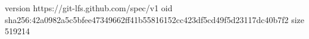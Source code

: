 version https://git-lfs.github.com/spec/v1
oid sha256:42a0982a5c5bfee47349662ff41b55816152cc423df5cd49f5d23117dc40b7f2
size 519214
